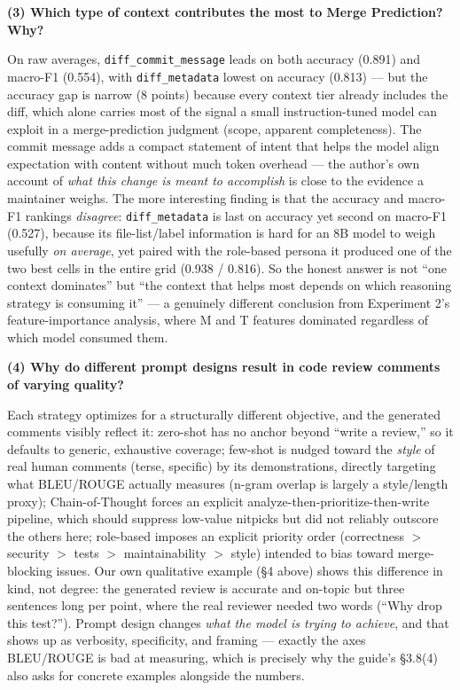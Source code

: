 \documentclass{experimentreport}
\begin{document}
{\textbf{(3) Which type of context contributes the most to Merge Prediction? Why?}

On raw averages, \texttt{diff\_commit\_message} leads on both accuracy (0.891) and macro-F1 (0.554),
with \texttt{diff\_metadata} lowest on accuracy (0.813) --- but the accuracy gap is narrow (8 points)
because every context tier already includes the diff, which alone carries most of the signal a small
instruction-tuned model can exploit in a merge-prediction judgment (scope, apparent completeness).
The commit message adds a compact statement of intent that helps the model align expectation with
content without much token overhead --- the author's own account of \emph{what this change is meant
to accomplish} is close to the evidence a maintainer weighs. The more interesting finding is that
the accuracy and macro-F1 rankings \emph{disagree}: \texttt{diff\_metadata} is last on accuracy yet
second on macro-F1 (0.527), because its file-list/label information is hard for an 8B model to weigh
usefully \emph{on average}, yet paired with the role-based persona it produced one of the two best
cells in the entire grid (0.938 / 0.816). So the honest answer is not ``one context dominates'' but
``the context that helps most depends on which reasoning strategy is consuming it'' --- a genuinely
different conclusion from Experiment 2's feature-importance analysis, where M and T features
dominated regardless of which model consumed them.

\textbf{(4) Why do different prompt designs result in code review comments of varying quality?}

Each strategy optimizes for a structurally different objective, and the generated comments visibly
reflect it: zero-shot has no anchor beyond ``write a review,'' so it defaults to generic,
exhaustive coverage; few-shot is nudged toward the \emph{style} of real human comments (terse,
specific) by its demonstrations, directly targeting what BLEU/ROUGE actually measures (n-gram
overlap is largely a style/length proxy); Chain-of-Thought forces an explicit
analyze-then-prioritize-then-write pipeline, which should suppress low-value nitpicks but did not
reliably outscore the others here; role-based imposes an explicit priority order (correctness $>$
security $>$ tests $>$ maintainability $>$ style) intended to bias toward merge-blocking issues.
Our own qualitative example (\S4 above) shows this difference in kind, not degree: the generated
review is accurate and on-topic but three sentences long per point, where the real reviewer needed
two words (``Why drop this test?''). Prompt design changes \emph{what the model is trying to
achieve}, and that shows up as verbosity, specificity, and framing --- exactly the axes BLEU/ROUGE
is bad at measuring, which is precisely why the guide's \S3.8(4) also asks for concrete examples
alongside the numbers.

}
\end{document}
